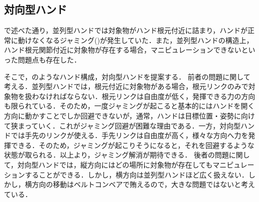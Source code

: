 \documentclass[a4paper,twoside,12pt,papersize, dvipdfmx]{iirthesis}
\begin{document}
\subsection{対向型ハンド}\label{subsec::sicm::oppositehand}
で述べた通り，並列型ハンドでは対象物がハンド根元付近に詰まり，ハンドが正常に動けなくなるジャミング()が発生していた．また，並列型ハンドの構造上，ハンド根元関節付近に対象物が存在する場合，マニピュレーションできないといった問題点も存在した．\par
そこで，のようなハンド構成，対向型ハンドを提案する．
前者の問題に関して考える．並列型ハンドでは，根元付近に対象物がある場合，根元リンクのみで対象物を扱わなければならない．根元リンクは自由度が低く，発揮できる力の方向も限られている．そのため，一度ジャミングが起こると基本的にはハンドを開く方向に動かすことでしか回避できないが，通常，ハンドは目標位置・姿勢に向けて狭まっていく．これがジャミング回避が困難な理由である．一方，対向型ハンドでは手先のリンクが使える．手先リンクは自由度が高く，様々な方向へ力を発揮できる．そのため，ジャミングが起こりそうになると，それを回避するような状態が取られる．以上より，ジャミング解消が期待できる．
後者の問題に関して，対向型ハンドでは，縦方向にはどの場所に対象物が存在してもマニピュレーションすることができる．しかし，横方向は並列型ハンドほど広く扱えない．しかし，横方向の移動はベルトコンベアで賄えるので，大きな問題ではないと考えている．
\end{document}
